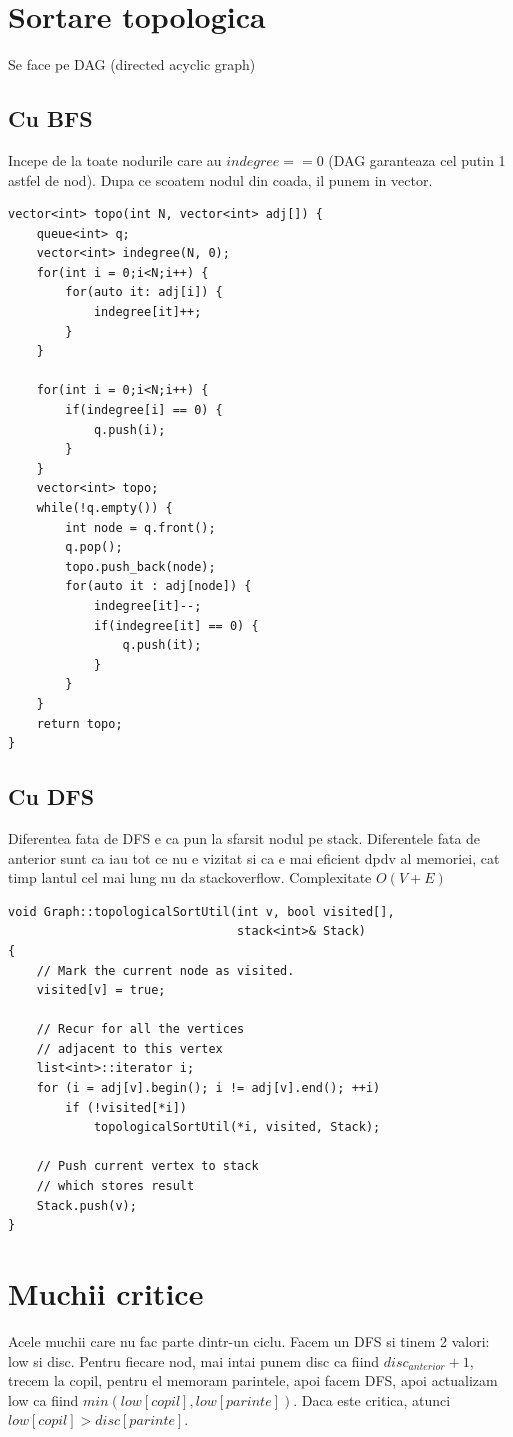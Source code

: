\documentclass{article}
\begin{document}
\section{Sortare topologica}
Se face pe DAG (directed acyclic graph)
\subsection*{Cu BFS} Incepe de la toate nodurile care au $indegree == 0$ (DAG garanteaza cel putin 1 astfel de nod). Dupa ce scoatem nodul din coada, il punem in vector.
\begin{lstlisting}
vector<int> topo(int N, vector<int> adj[]) {
    queue<int> q; 
    vector<int> indegree(N, 0); 
    for(int i = 0;i<N;i++) {
        for(auto it: adj[i]) {
            indegree[it]++; 
        }
    }
    
    for(int i = 0;i<N;i++) {
        if(indegree[i] == 0) {
            q.push(i); 
        }
    }
    vector<int> topo;
    while(!q.empty()) {
        int node = q.front(); 
        q.pop(); 
        topo.push_back(node);
        for(auto it : adj[node]) {
            indegree[it]--;
            if(indegree[it] == 0) {
                q.push(it); 
            }
        }
    }
    return topo;
}
    \end{lstlisting}
\subsection*{Cu DFS} Diferentea fata de DFS e ca pun la sfarsit nodul pe stack. Diferentele fata de anterior sunt ca iau tot ce nu e vizitat si ca e mai eficient dpdv al memoriei, cat timp lantul cel mai lung nu da stackoverflow. Complexitate $O(V+E)$

\begin{lstlisting}
void Graph::topologicalSortUtil(int v, bool visited[],
                                stack<int>& Stack)
{
    // Mark the current node as visited.
    visited[v] = true;
 
    // Recur for all the vertices
    // adjacent to this vertex
    list<int>::iterator i;
    for (i = adj[v].begin(); i != adj[v].end(); ++i)
        if (!visited[*i])
            topologicalSortUtil(*i, visited, Stack);
 
    // Push current vertex to stack
    // which stores result
    Stack.push(v);
}
    \end{lstlisting}

\section{Muchii critice} Acele muchii care nu fac parte dintr-un ciclu. Facem un DFS si tinem 2 valori: low si disc. Pentru fiecare nod, mai intai punem disc ca fiind $disc_{anterior} + 1$, trecem la copil, pentru el memoram parintele, apoi facem DFS, apoi actualizam low ca fiind $min(low[copil], low[parinte])$. Daca este critica, atunci $low[copil]>disc[parinte]$.
\end{document}
